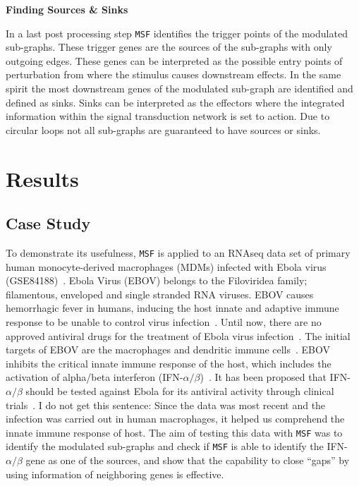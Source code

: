 \documentclass[10pt,a4paper,twocolumn]{article}
\newcommand{\TODO}[1]{\begingroup\color{red}#1\endgroup}
\begin{document}
\textbf{Finding Sources \& Sinks}

In a last post processing step \texttt{MSF} identifies the trigger points
of the modulated sub-graphs. These trigger genes are the sources of the
sub-graphs with only outgoing edges. These genes can be interpreted as the
possible entry points of perturbation from where the stimulus causes
downstream effects. In the same spirit the most downstream genes of the
modulated sub-graph are identified and defined as sinks. Sinks can be
interpreted as the effectors where the integrated information within the
signal transduction network is set to action. Due to circular loops not all
sub-graphs are guaranteed to have sources or sinks.


\section*{Results}

\subsection*{Case Study}

To demonstrate its usefulness, \texttt{MSF} is applied to an RNAseq data
set of primary human monocyte-derived macrophages (MDMs) infected with
Ebola virus (GSE84188)~\cite{Olejnik}. Ebola Virus (EBOV) belongs to the
Filoviridea family; filamentous, enveloped and single stranded RNA
viruses. EBOV causes hemorrhagic fever in humans, inducing the host innate
and adaptive immune response to be unable to control virus
infection~\cite{Prins}. Until now, there are no approved antiviral drugs
for the treatment of Ebola virus infection~\cite{Konde,Rhein}.  The initial
targets of EBOV are the macrophages and dendritic immune
cells~\cite{Falasca,Rhein}. EBOV inhibits the critical innate immune
response of the host, which includes the activation of alpha/beta
interferon (IFN-$\alpha / \beta$)~\cite{Prins,Konde,Cardenas}. It has been
proposed that IFN-$\alpha / \beta$ should be tested against Ebola for its
antiviral activity through clinical trials~\cite{Konde}. \TODO{I do not get
this sentence: Since the data was most recent and the infection was
carried out in human macrophages, it helped us comprehend the innate
immune response of host}. The aim of testing this data with \texttt{MSF} was
to identify the modulated sub-graphs and check if \texttt{MSF} is able to
identify the IFN-$\alpha / \beta$ gene as one of the sources, and show that
the capability to close ``gaps'' by using information of neighboring genes
is effective.
\end{document}
